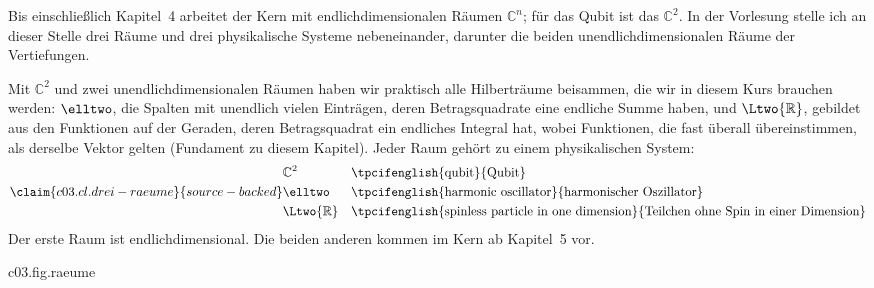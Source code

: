 Bis einschließlich Kapitel~4 arbeitet der Kern mit endlichdimensionalen Räumen
$\mathbb{C}^n$; für das Qubit ist das $\mathbb{C}^2$. In der Vorlesung stelle ich an dieser
Stelle drei Räume und drei physikalische Systeme nebeneinander, darunter die beiden
unendlichdimensionalen Räume der Vertiefungen.

\begin{vertiefung}[id=c03.v3,
    titel={Drei Räume, drei Systeme},
    wozu={Die drei Räume dieses Kapitels nebeneinander, jeder mit dem physikalischen System,
      zu dem er gehört. Damit sind praktisch alle Hilberträume des Kurses beisammen.},
    voraussetzung={Vertiefungen~\ref{c03.v1} und~\ref{c03.v2}. Der Kern bis Kapitel~4
      braucht den Block nicht.},
    zurueck={Der Kern arbeitet bis einschließlich Kapitel~4 mit $\mathbb{C}^n$; für das
      Qubit ist das $\mathbb{C}^2$.}]
  \begin{greybox}
  Mit $\mathbb{C}^2$ und zwei unendlichdimensionalen Räumen haben wir praktisch alle
  Hilberträume beisammen, die wir in diesem Kurs brauchen werden: $\elltwo$, die Spalten
  mit unendlich vielen Einträgen, deren Betragsquadrate eine endliche Summe haben, und
  $\Ltwo{\mathbb{R}}$, gebildet aus den Funktionen auf der Geraden, deren Betragsquadrat ein
  endliches Integral hat, wobei Funktionen, die fast überall übereinstimmen, als derselbe
  Vektor gelten (Fundament zu diesem Kapitel). Jeder Raum gehört zu einem physikalischen
  System:
  \begin{equation}\label{c03.eq.drei-raeume}\claim{c03.cl.drei-raeume}{source-backed}
    \begin{aligned}
      &\mathbb{C}^2 && \text{\tpcifenglish{qubit}{Qubit}} \\
      &\elltwo && \text{\tpcifenglish{harmonic oscillator}{harmonischer Oszillator}} \\
      &\Ltwo{\mathbb{R}} && \text{\tpcifenglish{spinless particle in one dimension}{Teilchen ohne Spin in einer Dimension}}
    \end{aligned}
  \end{equation}
  Der erste Raum ist endlichdimensional. Die beiden anderen kommen im Kern ab Kapitel~5
  vor.
  \end{greybox}

\begin{tpcfigure}{c03.fig.raeume}
  \caption{Die drei Räume nebeneinander, jeweils mit den Betragsquadraten eines Vektors.
    (a) $\mathbb{C}^2$: der Vektor $\tfrac12\vb{v}$ mit $\vb{v}$ aus
    Gleichung~\eqref{c03.eq.c2-vektoren}; seine beiden Betragsquadrate sind je $\tfrac12$.
    (b) $\elltwo$: die Betragsquadrate $\abs{v_j}^2 = 1/j^2$ der ersten zwölf Einträge des
    Vektors mit $v_j = 1/j$; es folgen unendlich viele weitere. (c) $\Ltwo{\mathbb{R}}$: das
    Betragsquadrat $\abs{f(x)}^2 = e^{-x^2}$ der Funktion $f(x) = e^{-x^2/2}$. Das
    Skalarprodukt des Vektors mit sich selbst ist links eine Summe von zwei Balken, in der
    Mitte eine Summe von unendlich vielen, rechts die Fläche unter der Kurve.}
  \end{tpcfigure}
\end{vertiefung}

